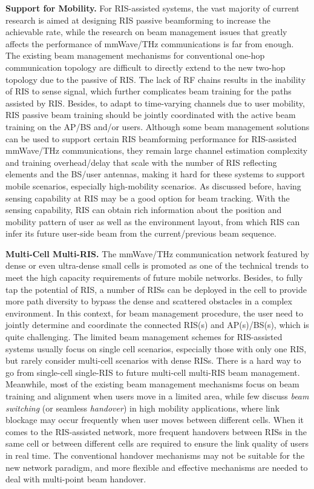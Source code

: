 \documentclass[journal,comsoc]{IEEEtran}
\begin{document}
{\bf{Support for Mobility.}} For RIS-assisted systems, the vast majority of current research is aimed at designing RIS passive beamforming to increase the achievable rate, while the research on beam management issues that greatly affects the performance of mmWave/THz communications is far from enough. The existing beam management mechanisms for conventional one-hop communication topology are difficult to directly extend to the new two-hop topology due to the passive of RIS. The lack of RF chains results in the inability of RIS to sense signal, which further complicates beam training for the paths assisted by RIS. Besides, to adapt to time-varying channels due to user mobility, RIS passive beam training should be jointly coordinated with the active beam training on the AP/BS and/or users. Although some beam management solutions can be used to support certain RIS beamforming performance for RIS-assisted mmWave/THz communications, they remain large channel estimation complexity and training overhead/delay that scale with the number of RIS reflecting elements and the BS/user antennas, making it hard for these systems to support mobile scenarios, especially high-mobility scenarios. As discussed before, having sensing capability at RIS may be a good option for beam tracking. With the sensing capability, RIS can obtain rich information about the position and mobility pattern of user as well as the environment layout, from which RIS can infer its future user-side beam from the current/previous beam sequence.




{\bf{Multi-Cell Multi-RIS.}} The mmWave/THz communication network featured by dense or even ultra-dense small cells is promoted as one of the technical trends to meet the high capacity requirements of future mobile networks. Besides, to fully tap the potential of RIS, a number of RISs can be deployed in the cell to provide more path diversity to bypass the dense and scattered obstacles in a complex environment. In this context, for beam management procedure, the user need to jointly determine and coordinate the connected RIS(s) and AP(s)/BS(s), which is quite challenging. The limited beam management schemes for RIS-assisted systems usually focus on single cell scenarios, especially those with only one RIS, but rarely consider multi-cell scenarios with dense RISs. There is a hard way to go from single-cell single-RIS to future multi-cell multi-RIS beam management. Meanwhile, most of the existing beam management mechanisms focus on beam training and alignment when users move in a limited area, while few discuss \emph{beam switching} (or seamless \emph{handover}) in high mobility applications, where link blockage may occur frequently when user moves between different cells. When it comes to the RIS-assisted network, more frequent handovers between RISs in the same cell or between different cells are required to ensure the link quality of users in real time. The conventional handover mechanisms may not be suitable for the new network paradigm, and more flexible and effective mechanisms are needed to deal with multi-point beam handover.
\end{document}
